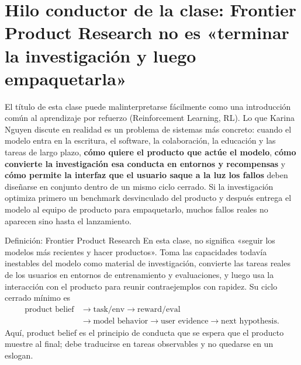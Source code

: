\section{Hilo conductor de la clase: Frontier Product Research no es «terminar la investigación y luego empaquetarla»}

El título de esta clase puede malinterpretarse fácilmente como una introducción común al aprendizaje por refuerzo (Reinforcement Learning, RL). Lo que Karina Nguyen discute en realidad es un problema de sistemas más concreto: cuando el modelo entra en la escritura, el software, la colaboración, la educación y las tareas de largo plazo, \textbf{cómo quiere el producto que actúe el modelo}, \textbf{cómo convierte la investigación esa conducta en entornos y recompensas} y \textbf{cómo permite la interfaz que el usuario saque a la luz los fallos} deben diseñarse en conjunto dentro de un mismo ciclo cerrado. Si la investigación optimiza primero un benchmark desvinculado del producto y después entrega el modelo al equipo de producto para empaquetarlo, muchos fallos reales no aparecen sino hasta el lanzamiento.



\begin{importantbox}{Definición: Frontier Product Research}
En esta clase,  no significa «seguir los modelos más recientes y hacer productos». Toma las capacidades todavía inestables del modelo como material de investigación, convierte las tareas reales de los usuarios en entornos de entrenamiento y evaluaciones, y luego usa la interacción con el producto para reunir contraejemplos con rapidez. Su ciclo cerrado mínimo es
\[
\begin{aligned}
\text{product belief}&\rightarrow \text{task/env}\rightarrow \text{reward/eval}\\
&\rightarrow \text{model behavior}\rightarrow \text{user evidence}\rightarrow \text{next hypothesis}.
\end{aligned}
\]
Aquí, product belief es el principio de conducta que se espera que el producto muestre al final; debe traducirse en tareas observables y no quedarse en un eslogan.
\end{importantbox}

